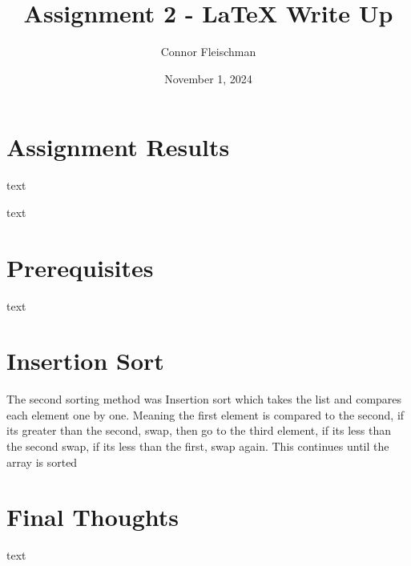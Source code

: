 \documentclass[12pt, letterpaper]{article}
\title{Assignment 2 - LaTeX Write Up}
\author{Connor Fleischman}
\date{November 1, 2024}
\begin{document}
\maketitle

\section{Assignment Results} \label{AssignmentResult}
text

\begin{center}
\end{center}

text

\section{Prerequisites} \label{Prereq}
text





\section{Insertion Sort} \label{Insertion}
The second sorting method was Insertion sort which takes the list and compares each element one by one. Meaning the first element is compared to the second, if its greater than the second, swap, then go to the third element, if its less 
than the second swap, if its less than the first, swap again. This continues until the array is sorted



\section{Final Thoughts} \label{Final}
text
\end{document}
